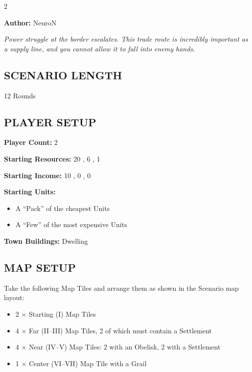 
\begin{multicols*}{2}

\textbf{Author:} NeuroN

\textit{Power struggle at the border escalates. This trade route is incredibly important as a supply line, and you cannot allow it to fall into enemy hands.}

\subsection*{\MakeUppercase{Scenario Length}}
12 Rounds

\subsection*{\MakeUppercase{Player Setup}}
\textbf{Player Count:} 2

\textbf{Starting Resources:} 20 , 6 , 1 

\textbf{Starting Income:} 10 , 0 , 0 

\textbf{Starting Units:}

\begin{itemize}
  \item A ``Pack'' of the cheapest  Units
  \item A ``Few'' of the most expensive  Units
\end{itemize}

\textbf{Town Buildings:}  Dwelling

\subsection*{\MakeUppercase{Map Setup}}

Take the following Map Tiles and arrange them as shown in the Scenario map layout:

\begin{itemize}
  \item 2 × Starting (I) Map Tiles
  \item 4 × Far (II--III) Map Tiles, 2 of which must contain a Settlement
  \item 4 × Near (IV--V) Map Tiles: 2 with an Obelisk, 2 with a Settlement
  \item 1 × Center (VI--VII) Map Tile with a Grail
\end{itemize}


\end{multicols*}
